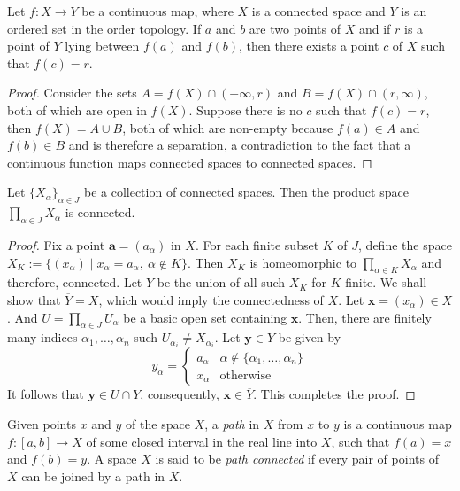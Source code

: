 \begin{theorem}
    Let $f:X\to Y$ be a continuous map, where $X$ is a connected space and $Y$ is an ordered set in the order topology. If $a$ and $b$ are two points of $X$ and if $r$ is a point of $Y$ lying between $f(a)$ and $f(b)$, then there exists a point $c$ of $X$ such that $f(c) = r$.
\end{theorem}
\begin{proof}
    Consider the sets $A = f(X)\cap(-\infty, r)$ and $B = f(X)\cap(r,\infty)$, both of which are open in $f(X)$. Suppose there is no $c$ such that $f(c) = r$, then $f(X) = A\cup B$, both of which are non-empty because $f(a)\in A$ and $f(b)\in B$ and is therefore a separation, a contradiction to the fact that a continuous function maps connected spaces to connected spaces.
\end{proof}

\begin{theorem}
    Let $\{X_\alpha\}_{\alpha\in J}$ be a collection of connected spaces. Then the product space $\prod_{\alpha\in J} X_\alpha$ is connected.
\end{theorem}
\begin{proof}
    Fix a point $\mathbf a = (a_\alpha)$ in $X$. For each finite subset $K$ of $J$, define the space $X_K := \{(x_\alpha)\mid x_\alpha = a_\alpha,~\alpha\notin K\}$. Then $X_K$ is homeomorphic to $\prod_{\alpha\in K} X_\alpha$ and therefore, connected. Let $Y$ be the union of all such $X_K$ for $K$ finite. We shall show that $\overline{Y} = X$, which would imply the connectedness of $X$. Let $\mathbf x = (x_\alpha)\in X$. And $U = \prod_{\alpha\in J} U_\alpha$ be a basic open set containing $\mathbf x$. Then, there are finitely many indices $\alpha_1,\ldots,\alpha_n$ such $U_{\alpha_i}\ne X_{\alpha_i}$. Let $\mathbf y\in Y$ be given by 
    \begin{equation*}
        y_\alpha = 
        \begin{cases}
            a_\alpha & \alpha\notin\{\alpha_1,\ldots,\alpha_n\}\\
            x_\alpha & \text{otherwise}
        \end{cases}
    \end{equation*}
    It follows that $\mathbf y\in U\cap Y$, consequently, $\mathbf x\in\overline{Y}$. This completes the proof.
\end{proof}

\begin{definition}
    Given points $x$ and $y$ of the space $X$, a \textit{path} in $X$ from $x$ to $y$ is a continuous map $f:[a,b]\to X$ of some closed interval in the real line into $X$, such that $f(a) = x$ and $f(b) = y$. A space $X$ is said to be \textit{path connected} if every pair of points of $X$ can be joined by a path in $X$.
\end{definition}


